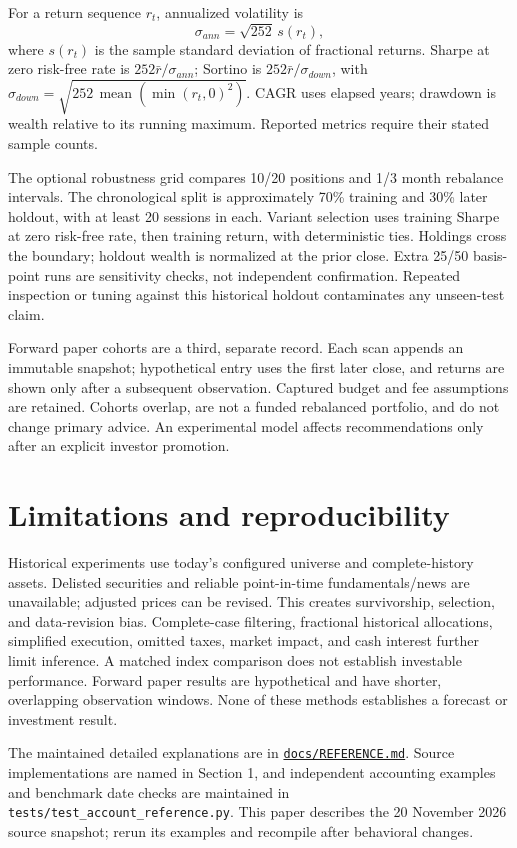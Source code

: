 \documentclass[11pt]{article}
\begin{document}
For a return sequence $r_t$, annualized volatility is
\[
\sigma_{ann}=\sqrt{252}\,s(r_t),
\]
where $s(r_t)$ is the sample standard deviation of fractional returns. Sharpe
at zero risk-free rate is $252\bar r/\sigma_{ann}$; Sortino is
$252\bar r/\sigma_{down}$, with
$\sigma_{down}=\sqrt{252\,\operatorname{mean}(\min(r_t,0)^2)}$. CAGR uses
elapsed years; drawdown is wealth relative to its running maximum. Reported
metrics require their stated sample counts.

The optional robustness grid compares 10/20 positions and 1/3 month
rebalance intervals. The chronological split is approximately 70\% training
and 30\% later holdout, with at least 20 sessions in each. Variant selection
uses training Sharpe at zero risk-free rate, then training return, with
deterministic ties. Holdings cross the boundary; holdout wealth is normalized
at the prior close. Extra 25/50 basis-point runs are sensitivity checks, not
independent confirmation. Repeated inspection or tuning against this
historical holdout contaminates any unseen-test claim.

Forward paper cohorts are a third, separate record. Each scan appends an
immutable snapshot; hypothetical entry uses the first later close, and returns
are shown only after a subsequent observation. Captured budget and fee
assumptions are retained. Cohorts overlap, are not a funded rebalanced
portfolio, and do not change primary advice. An experimental model affects
recommendations only after an explicit investor promotion.

\section{Limitations and reproducibility}

Historical experiments use today's configured universe and complete-history
assets. Delisted securities and reliable point-in-time fundamentals/news are
unavailable; adjusted prices can be revised. This creates survivorship,
selection, and data-revision bias. Complete-case filtering, fractional
historical allocations, simplified execution, omitted taxes, market impact,
and cash interest further limit inference. A matched index comparison does
not establish investable performance. Forward paper results are hypothetical
and have shorter, overlapping observation windows. None of these methods
establishes a forecast or investment result.

The maintained detailed explanations are in
\href{REFERENCE.md}{\texttt{docs/REFERENCE.md}}. Source implementations are
named in Section 1, and independent accounting examples and benchmark date
checks are maintained in \texttt{tests/test\_account\_reference.py}. This
paper describes the 20 November 2026 source snapshot; rerun its examples and
recompile after behavioral changes.
\end{document}
